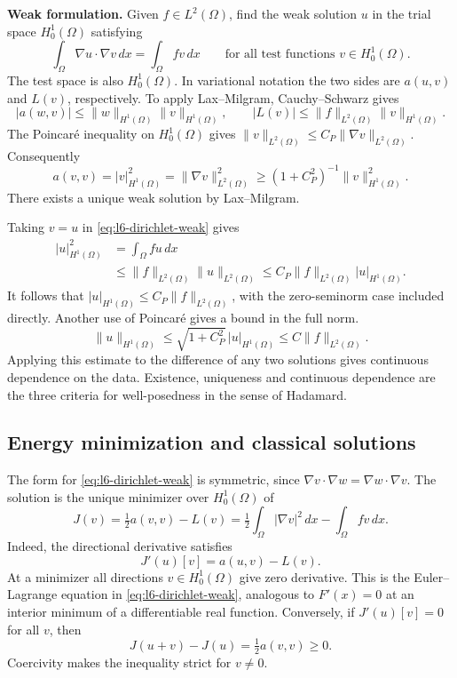 \documentclass[11pt,a4paper]{article}
\begin{document}
\medskip
\noindent\textbf{Weak formulation.}
Given \(f\in L^2(\Omega)\), find the weak solution \(u\) in the
trial space \(H_0^1(\Omega)\) satisfying
\begin{equation}
  \int_\Omega\nabla u\cdot\nabla v\,dx=\int_\Omega f v\,dx
  \qquad\text{for all test functions }v\in H_0^1(\Omega).
  \label{eq:l6-dirichlet-weak}
\end{equation}
The test space is also \(H_0^1(\Omega)\). In variational notation
the two sides are \(a(u,v)\) and \(L(v)\), respectively. To apply
Lax--Milgram, Cauchy--Schwarz gives
\[
  |a(w,v)|\le \|w\|_{H^1(\Omega)}\|v\|_{H^1(\Omega)},\qquad
  |L(v)|\le \|f\|_{L^2(\Omega)}\|v\|_{H^1(\Omega)}.
\]
The Poincar\'e inequality on \(H_0^1(\Omega)\) gives
\(\|v\|_{L^2(\Omega)}\le C_P\|\nabla v\|_{L^2(\Omega)}\).
Consequently
\[
  a(v,v)=|v|_{H^1(\Omega)}^2
         =\|\nabla v\|_{L^2(\Omega)}^2
  \ge (1+C_P^2)^{-1}\|v\|_{H^1(\Omega)}^2 .
\]
There exists a unique weak solution by Lax--Milgram.

Taking \(v=u\) in \eqref{eq:l6-dirichlet-weak} gives
\begin{align*}
  |u|_{H^1(\Omega)}^2
  &=\int_\Omega fu\,dx\\
  &\le \|f\|_{L^2(\Omega)}\|u\|_{L^2(\Omega)}
  \le C_P\|f\|_{L^2(\Omega)}|u|_{H^1(\Omega)}.
\end{align*}
It follows that \(|u|_{H^1(\Omega)}\le C_P\|f\|_{L^2(\Omega)}\),
with the zero-seminorm case included directly. Another use
of Poincar\'e gives a bound in the full norm.
\[
  \|u\|_{H^1(\Omega)}
  \le \sqrt{1+C_P^2}\,|u|_{H^1(\Omega)}
  \le C\|f\|_{L^2(\Omega)}.
\]
Applying this estimate to the difference of any two solutions gives
continuous dependence on the data. Existence, uniqueness and
continuous dependence are the three criteria for well-posedness in
the sense of Hadamard.

\subsection{Energy minimization and classical solutions}

The form for \eqref{eq:l6-dirichlet-weak} is symmetric, since
\(\nabla v\cdot\nabla w=\nabla w\cdot\nabla v\).
The solution is the unique minimizer over \(H_0^1(\Omega)\) of
\[
  J(v)=\tfrac12 a(v,v)-L(v)
      =\tfrac12\int_\Omega|\nabla v|^2\,dx-\int_\Omega fv\,dx .
\]
Indeed, the directional derivative satisfies
\[
  J'(u)[v]=a(u,v)-L(v).
\]
At a minimizer all directions \(v\in H_0^1(\Omega)\) give zero
derivative. This is the Euler--Lagrange equation in
\eqref{eq:l6-dirichlet-weak}, analogous to \(F'(x)=0\) at an
interior minimum of a differentiable real function.
Conversely, if \(J'(u)[v]=0\) for all \(v\), then
\[
  J(u+v)-J(u)=\tfrac12 a(v,v)\ge 0.
\]
Coercivity makes the inequality strict for \(v\ne 0\).
\end{document}

